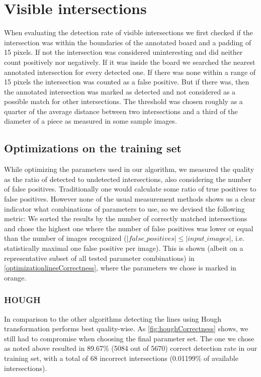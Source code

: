 	\section{Visible intersections}
	When evaluating the detection rate of visible intersections we first checked if the intersection was within the boundaries of the annotated board and a padding of 15 pixels. If not the intersection was considered uninteresting and did neither count positively nor negatively. If it was inside the board we searched the nearest annotated intersection for every detected one. If there was none within a range of 15 pixels the intersection was counted as a false positive. But if there was, then the annotated intersection was marked as detected and not considered as a possible match for other intersections. The threshold was chosen roughly as a quarter of the average distance between two intersections and a third of the diameter of a piece as measured in some sample images.

	

	\subsection{Optimizations on the training set}
	While optimizing the parameters used in our algorithm, we measured the quality as the ratio of detected to undetected intersections, also considering the number of false positives. Traditionally one would calculate some ratio of true positives to false positives. However none of the usual measurement methods shows us a clear indicator what combinations of parameters to use, so we devised the following metric: We sorted the results by the number of correctly matched intersections and chose the highest one where the number of false positives was lower or equal than the number of images recognized ($|false\_positives| \leq |input\_images|$, i.e. statistically maximal one false positive per image). This is shown (albeit on a representative subset of all tested parameter combinations) in \autoref{optimizationlinesCorrectness}, where the parameters we chose is marked in orange.

	\subsubsection{HOUGH}
	In comparison to the other algorithms detecting the lines using Hough transformation performs best quality-wise. As \autoref{fig:houghCorrectness} shows, we still had to compromise when choosing the final parameter set. The one we chose as noted above resulted in 89.67\% (5084 out of 5670) correct detection rate in our training set, with a total of 68 incorrect intersections (0.01199\% of available intersections).

